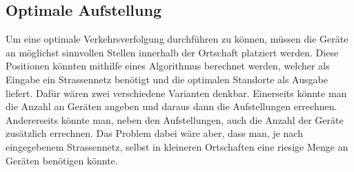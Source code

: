 \subsection{Optimale Aufstellung}
Um eine optimale Verkehrsverfolgung durchführen zu können, müssen die Geräte an möglichst sinnvollen Stellen innerhalb der Ortschaft platziert werden. Diese Positionen könnten mithilfe eines Algorithmus berechnet werden, welcher als Eingabe ein Strassennetz benötigt und die optimalen Standorte als Ausgabe liefert. Dafür wären zwei verschiedene Varianten denkbar. Einerseits könnte man die Anzahl an Geräten angeben und daraus dann die Aufstellungen errechnen. Andererseits könnte man, neben den Aufstellungen, auch die Anzahl der Geräte zusätzlich errechnen. Das Problem dabei wäre aber, dass man, je nach eingegebenem Strassennetz, selbst in kleineren Ortschaften eine riesige Menge an Geräten benötigen könnte.
